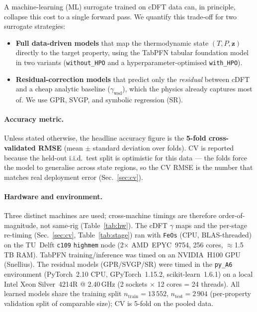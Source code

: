 \documentclass[11pt]{article}
\begin{document}
A machine-learning (ML) surrogate trained on cDFT data can, in principle,
collapse this cost to a single forward pass. We quantify this trade-off for two
surrogate strategies:
\begin{itemize}
  \item \textbf{Full data-driven models} that map the thermodynamic state
        $(T,P,\mathbf{z})$ directly to the target property, using the TabPFN
        tabular foundation model in two variants (\texttt{without\_HPO} and a
        hyperparameter-optimised \texttt{with\_HPO}).
  \item \textbf{Residual-correction models} that predict only the
        \emph{residual} between cDFT and a cheap analytic baseline
        ($\gamma_\mathrm{wsd}$), which the physics already captures most of.
        We use GPR, SVGP, and symbolic regression (SR).
\end{itemize}

\paragraph{Accuracy metric.}
Unless stated otherwise, the headline accuracy figure is the \textbf{5-fold
cross-validated RMSE} (mean $\pm$ standard deviation over folds). CV is reported
because the held-out i.i.d.\ test split is optimistic for this data --- the
folds force the model to generalise across state regions, so the CV RMSE is the
number that matches real deployment error (Sec.~\ref{sec:cv}).

\paragraph{Hardware and environment.}
Three distinct machines are used; cross-machine timings are therefore
order-of-magnitude, not same-rig (Table~\ref{tab:hw}). The cDFT $\gamma$ maps and
the per-stage re-timing (Sec.~\ref{sec:cv}, Table~\ref{tab:stage}) ran with
\texttt{FeOs} (CPU, BLAS-threaded) on the TU~Delft \texttt{c109} \texttt{highmem}
node (2$\times$ AMD~EPYC~9754, 256 cores, $\approx$1.5\,TB RAM). TabPFN
training/inference was timed on an NVIDIA~H100 GPU (Snellius). The residual
models (GPR/SVGP/SR) were timed in the \texttt{py\_A6} environment (PyTorch~2.10
CPU, GPyTorch~1.15.2, scikit-learn~1.6.1) on a local Intel Xeon Silver~4214R @
2.40\,GHz (2 sockets $\times$ 12 cores = 24 threads). All learned models share
the training split $n_\mathrm{train}=13\,552$, $n_\mathrm{test}=2\,904$
(per-property validation split of comparable size); CV is 5-fold on the pooled
data.
\end{document}
